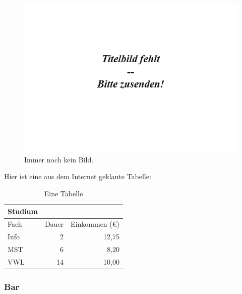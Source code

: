 \documentclass{doku2018}
\begin{document}
\blindtext

\begin{figure}
\begin{center}
\includegraphics[width=.9\textwidth]{Titelbild-fehlt.png}
\caption{Immer noch kein Bild.}
\label{fig:captionssolltenaussagekraeftigsein}
\end{center}
\end{figure}

\Blindtext

Hier ist eine aus dem Internet geklaute Tabelle:


\begin{table}
  \begin{center}
    \caption{Eine Tabelle}
  \begin{tabular}{lrr}
    
\toprule
Studium\\  
\midrule 
Fach & Dauer & Einkommen (\euro{})\\ 
\midrule 
Info & 2 & 12,75 \\
MST & 6 & 8,20 \\
VWL & 14 & 10,00\\ 
\bottomrule
  \end{tabular}
  \end{center}
  \end{table}


\blindtext
\subsubsection{Bar}

\blindtext


\blindtext
\end{document}

